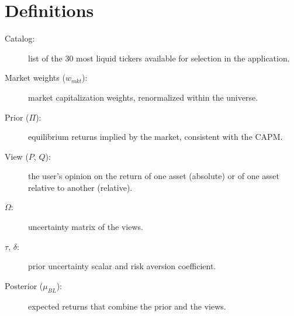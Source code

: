 \section{Definitions}
\begin{description}
  \item[Catalog:] list of the 30 most liquid tickers available for selection in the application.
  \item[Market weights ($w_{mkt}$):] market capitalization weights, renormalized within the universe.
  \item[Prior ($\Pi$):] equilibrium returns implied by the market, consistent with the CAPM.
  \item[View ($P$, $Q$):] the user's opinion on the return of one asset (absolute) or of one asset
        relative to another (relative).
  \item[$\Omega$:] uncertainty matrix of the views.
  \item[$\tau$, $\delta$:] prior uncertainty scalar and risk aversion coefficient.
  \item[Posterior ($\mu_{BL}$):] expected returns that combine the prior and the views.
\end{description}
